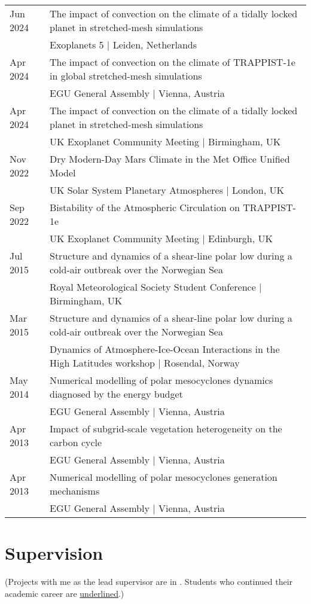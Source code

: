 \documentclass[a4paper, 11pt]{article}
\begin{document}
\begin{tabularx}{\linewidth}{@{}l X@{}}
Jun 2024 & The impact of convection on the climate of a tidally locked planet in stretched-mesh simulations \\ & Exoplanets 5 | Leiden, Netherlands \\
Apr 2024 & The impact of convection on the climate of TRAPPIST-1e in global stretched-mesh simulations \\ & EGU General Assembly | Vienna, Austria \\
Apr 2024 & The impact of convection on the climate of a tidally locked planet in stretched-mesh simulations \\ & UK Exoplanet Community Meeting | Birmingham, UK \\
Nov 2022 & Dry Modern-Day Mars Climate in the Met Office Unified Model \\ & UK Solar System Planetary Atmospheres | London, UK \\
Sep 2022 & Bistability of the Atmospheric Circulation on TRAPPIST-1e \\ & UK Exoplanet Community Meeting | Edinburgh, UK \\
Jul 2015 & Structure and dynamics of a shear-line polar low during a cold-air outbreak over the Norwegian Sea \\ & Royal Meteorological Society Student Conference | Birmingham, UK \\
Mar 2015 & Structure and dynamics of a shear-line polar low during a cold-air outbreak over the Norwegian Sea \\ & Dynamics of Atmosphere-Ice-Ocean Interactions in the High Latitudes workshop | Rosendal, Norway \\
May 2014 & Numerical modelling of polar mesocyclones dynamics diagnosed by the energy budget \\ & EGU General Assembly | Vienna, Austria \\
Apr 2013 & Impact of subgrid-scale vegetation heterogeneity on the carbon cycle \\ & EGU General Assembly | Vienna, Austria \\
Apr 2013 & Numerical modelling of polar mesocyclones generation mechanisms \\ & EGU General Assembly | Vienna, Austria \\
\end{tabularx}


\section{Supervision}
\vspace{5pt}
{\scriptsize(Projects with me as the lead supervisor are in . Students who continued their academic career are \ul{underlined}.)}
\end{document}
